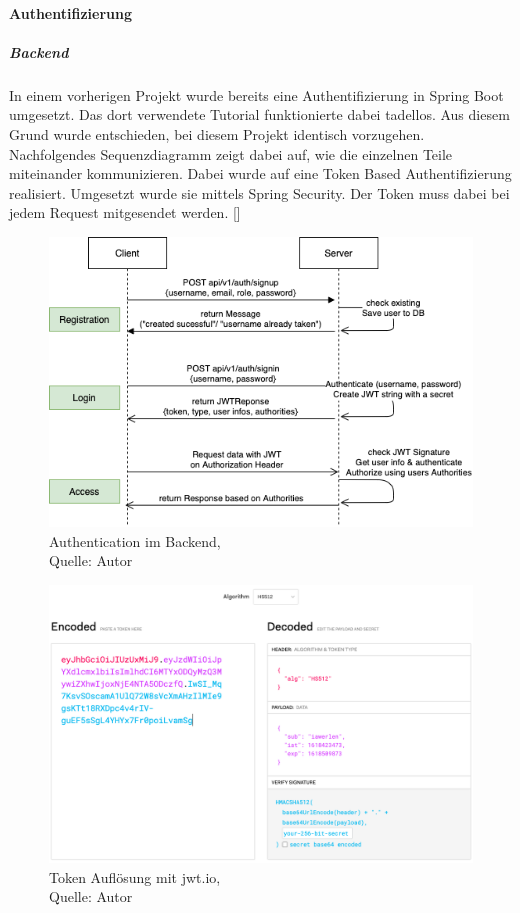 \paragraph{Authentifizierung}
\subparagraph{Backend}
 In einem vorherigen Projekt wurde bereits eine Authentifizierung in Spring Boot umgesetzt. Das dort verwendete Tutorial funktionierte dabei tadellos. Aus diesem Grund wurde entschieden, bei diesem Projekt identisch vorzugehen. Nachfolgendes Sequenzdiagramm zeigt dabei auf, wie die einzelnen Teile miteinander kommunizieren. Dabei wurde auf eine Token Based Authentifizierung realisiert. Umgesetzt wurde sie mittels Spring Security. Der Token muss dabei bei jedem Request mitgesendet werden. [\cite{authAPISpring}]
  
\begin{figure}[H]
  	\centering
  	\includegraphics[width=1\textwidth]{images/Authentication.PNG}
  	\caption[Authentication im Backend]{Authentication im Backend,\\ Quelle: Autor}
  	\label{img: AuthenticationBackend}
\end{figure} 
\begin{figure}[H]
	\centering
	\includegraphics[width=1\textwidth]{images/jwtIO.PNG}
	\caption[Token Auflösung mit jwt.io]{Token Auflösung mit jwt.io,\\ Quelle: Autor}
	\label{img: jwtio}
\end{figure} 


